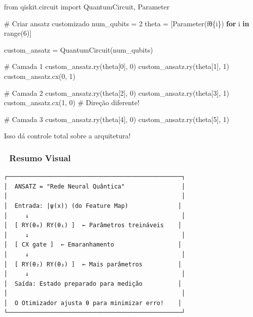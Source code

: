 \documentclass[
  brazilian,
]{report}
\newenvironment{Shaded}{\begin{snugshade}}{\end{snugshade}}
\newcommand{\BuiltInTok}[1]{\textcolor[rgb]{0.00,0.23,0.31}{#1}}
\newcommand{\CommentTok}[1]{\textcolor[rgb]{0.37,0.37,0.37}{#1}}
\newcommand{\ControlFlowTok}[1]{\textcolor[rgb]{0.00,0.23,0.31}{\textbf{#1}}}
\newcommand{\DecValTok}[1]{\textcolor[rgb]{0.68,0.00,0.00}{#1}}
\newcommand{\ImportTok}[1]{\textcolor[rgb]{0.00,0.46,0.62}{#1}}
\newcommand{\KeywordTok}[1]{\textcolor[rgb]{0.00,0.23,0.31}{\textbf{#1}}}
\newcommand{\NormalTok}[1]{\textcolor[rgb]{0.00,0.23,0.31}{#1}}
\newcommand{\OperatorTok}[1]{\textcolor[rgb]{0.37,0.37,0.37}{#1}}
\newcommand{\SpecialCharTok}[1]{\textcolor[rgb]{0.37,0.37,0.37}{#1}}
\newcommand{\SpecialStringTok}[1]{\textcolor[rgb]{0.13,0.47,0.30}{#1}}
\begin{document}
\begin{Shaded}
\begin{Highlighting}[]
\ImportTok{from}\NormalTok{ qiskit.circuit }\ImportTok{import}\NormalTok{ QuantumCircuit, Parameter}

\CommentTok{\# Criar ansatz customizado}
\NormalTok{num\_qubits }\OperatorTok{=} \DecValTok{2}
\NormalTok{theta }\OperatorTok{=}\NormalTok{ [Parameter(}\SpecialStringTok{f\textquotesingle{}θ}\SpecialCharTok{\{}\NormalTok{i}\SpecialCharTok{\}}\SpecialStringTok{\textquotesingle{}}\NormalTok{) }\ControlFlowTok{for}\NormalTok{ i }\KeywordTok{in} \BuiltInTok{range}\NormalTok{(}\DecValTok{6}\NormalTok{)]}

\NormalTok{custom\_ansatz }\OperatorTok{=}\NormalTok{ QuantumCircuit(num\_qubits)}

\CommentTok{\# Camada 1}
\NormalTok{custom\_ansatz.ry(theta[}\DecValTok{0}\NormalTok{], }\DecValTok{0}\NormalTok{)}
\NormalTok{custom\_ansatz.ry(theta[}\DecValTok{1}\NormalTok{], }\DecValTok{1}\NormalTok{)}
\NormalTok{custom\_ansatz.cx(}\DecValTok{0}\NormalTok{, }\DecValTok{1}\NormalTok{)}

\CommentTok{\# Camada 2}
\NormalTok{custom\_ansatz.ry(theta[}\DecValTok{2}\NormalTok{], }\DecValTok{0}\NormalTok{)}
\NormalTok{custom\_ansatz.ry(theta[}\DecValTok{3}\NormalTok{], }\DecValTok{1}\NormalTok{)}
\NormalTok{custom\_ansatz.cx(}\DecValTok{1}\NormalTok{, }\DecValTok{0}\NormalTok{)  }\CommentTok{\# Direção diferente!}

\CommentTok{\# Camada 3}
\NormalTok{custom\_ansatz.ry(theta[}\DecValTok{4}\NormalTok{], }\DecValTok{0}\NormalTok{)}
\NormalTok{custom\_ansatz.ry(theta[}\DecValTok{5}\NormalTok{], }\DecValTok{1}\NormalTok{)}
\end{Highlighting}
\end{Shaded}

Isso dá controle total sobre a arquitetura!

\subsubsection{🔬 Resumo Visual}\label{resumo-visual}

\begin{verbatim}
┌─────────────────────────────────────────────────┐
│  ANSATZ = "Rede Neural Quântica"                │
│                                                 │
│  Entrada: |ψ(x)⟩ (do Feature Map)              │
│     ↓                                           │
│  [ RY(θ₀) RY(θ₁) ]  ← Parâmetros treináveis    │
│     ↓                                           │
│  [ CX gate ]  ← Emaranhamento                  │
│     ↓                                           │
│  [ RY(θ₂) RY(θ₃) ]  ← Mais parâmetros          │
│     ↓                                           │
│  Saída: Estado preparado para medição          │
│                                                 │
│  O Otimizador ajusta θ para minimizar erro!    │
└─────────────────────────────────────────────────┘
\end{verbatim}
\end{document}
